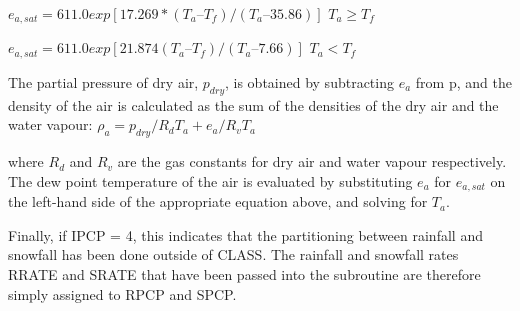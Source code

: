$e_{a,sat} = 611.0 exp[17.269*(T_a – T_f)/(T_a – 35.86)]$ $T_a \geq T_f$

$e_{a,sat} = 611.0 exp[21.874 (T_a – T_f)/(T_a – 7.66)]$ $T_a < T_f$

The partial pressure of dry air, $p_{dry}$, is obtained by subtracting $e_a$ from p, and the density of the air is calculated as the sum of the densities of the dry air and the water vapour\+: $\rho_a = p_{dry} / R_d T_a + e_a / R_v T_a$

where $R_d$ and $R_v$ are the gas constants for dry air and water vapour respectively. The dew point temperature of the air is evaluated by substituting $e_a$ for $e_{a,sat}$ on the left-\/hand side of the appropriate equation above, and solving for $T_a$.

Finally, if I\+P\+C\+P = 4, this indicates that the partitioning between rainfall and snowfall has been done outside of C\+L\+A\+S\+S. The rainfall and snowfall rates R\+R\+A\+T\+E and S\+R\+A\+T\+E that have been passed into the subroutine are therefore simply assigned to R\+P\+C\+P and S\+P\+C\+P.